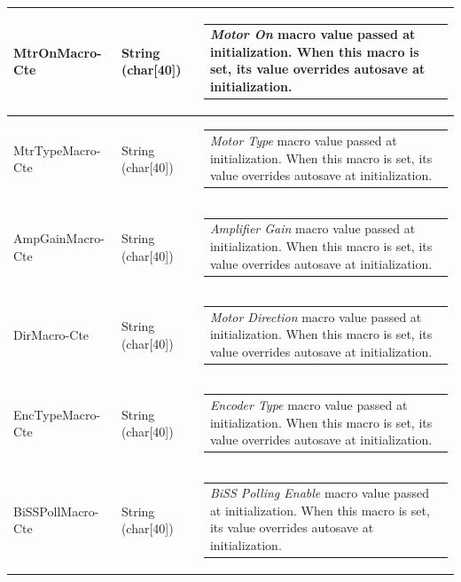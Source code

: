 \documentclass[openany]{article}
\begin{document}
\begin{longtable}{| m{4.5cm} m{2.5cm}  m{8.5cm} |}
        MtrOnMacro-Cte & String (char[40]) & \begin{tabular}{@{}m{6cm}@{}}
                \emph{Motor On} macro value passed at initialization. When this macro is set, its value overrides autosave at initialization.
            \end{tabular} \hypertarget{pv:mtr-type-macro-cte}{}\\ \hline
        MtrTypeMacro-Cte & String (char[40]) & \begin{tabular}{@{}m{6cm}@{}}
                \emph{Motor Type} macro value passed at initialization. When this macro is set, its value overrides autosave at initialization.
            \end{tabular} \hypertarget{pv:amp-gain-macro-cte}{}\\ \hline
        AmpGainMacro-Cte & String (char[40]) & \begin{tabular}{@{}m{6cm}@{}}
                \emph{Amplifier Gain} macro value passed at initialization. When this macro is set, its value overrides autosave at initialization.
            \end{tabular} \hypertarget{pv:dir-macro-cte}{}\\ \hline
        DirMacro-Cte & String (char[40]) & \begin{tabular}{@{}m{6cm}@{}}
                \emph{Motor Direction} macro value passed at initialization. When this macro is set, its value overrides autosave at initialization.
            \end{tabular} \hypertarget{pv:enc-type-macro-cte}{}\\ \hline
        EncTypeMacro-Cte & String (char[40]) & \begin{tabular}{@{}m{6cm}@{}}
                \emph{Encoder Type} macro value passed at initialization. When this macro is set, its value overrides autosave at initialization.
            \end{tabular} \hypertarget{pv:biss-poll-macro-cte}{}\\ \hline
        BiSSPollMacro-Cte & String (char[40]) & \begin{tabular}{@{}m{6cm}@{}}
                \emph{BiSS Polling Enable} macro value passed at initialization. When this macro is set, its value overrides autosave at initialization.
            \end{tabular} \hypertarget{pv:biss-clk-div-macro-cte}{}\\ \hline

\end{longtable}
\end{document}
